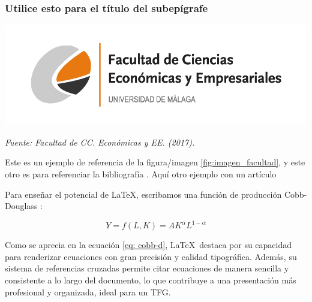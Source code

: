 \documentclass[13pt,a4paper]{report}
\begin{document}
\subsubsection*{Utilice esto para el título del subepígrafe} 

\begin{center}
    \centering %
    \includegraphics[width=\linewidth]{logo.png} %
    \label{fig:imagen_facultad} %
    \par %
    \raggedright %
    {\fontsize{12}{14}\selectfont\textit{Fuente: Facultad de CC. Económicas y EE. (2017).}} %
\end{center}

\vspace{12pt}

Este es un ejemplo de referencia de la figura/imagen \ref{fig:imagen_facultad}, y este otro es para referenciar la bibliografía \citep{tfg_sample}. Aquí otro ejemplo con un artículo \citep{baccini2007edgeworth}

\vspace{12pt}

Para enseñar el potencial de \LaTeX, escribamos una función de producción Cobb-Douglass \citep{cobb_theory_1928}: 

\begin{equation}
    Y = f(L,K) = A K^\alpha L^{1-\alpha} \label{eq: cobb-d}
\end{equation}

\vspace{12pt}

Como se aprecia en la ecuación \ref{eq: cobb-d}, \LaTeX\ destaca por su capacidad para renderizar ecuaciones con gran precisión y calidad tipográfica. Además, su sistema de referencias cruzadas permite citar ecuaciones de manera sencilla y consistente a lo largo del documento, lo que contribuye a una presentación más profesional y organizada, ideal para un TFG.
\end{document}
